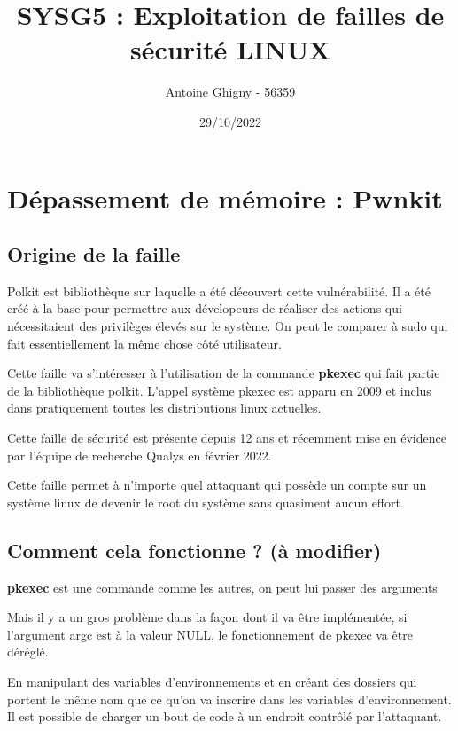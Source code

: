 \documentclass[a4paper, 12pt]{article}
\title{SYSG5 : Exploitation de failles de sécurité LINUX}
\author{Antoine Ghigny - 56359}          \let\Author\@author
\date{29/10/2022}           \let\Date\@date
\begin{document}
\maketitle 

   \tableofcontents

   \section{Dépassement de mémoire : Pwnkit}   		
		\subsection{Origine de la faille}   
   		\begin{flushleft}
			\noindent 	Polkit est bibliothèque sur laquelle a été découvert cette vulnérabilité. Il a été créé à la base pour permettre aux dévelopeurs de réaliser des actions qui nécessitaient des privilèges élevés sur le système. On peut le comparer à sudo qui fait essentiellement la même chose côté utilisateur.
   			\item Cette faille va s'intéresser à l'utilisation de la commande \textbf{pkexec} qui fait partie de la bibliothèque polkit. L'appel système pkexec est apparu en 2009 et inclus dans pratiquement toutes les distributions linux actuelles.
   			\item Cette faille de sécurité est présente depuis 12 ans et récemment mise en évidence par l'équipe de recherche Qualys en février 2022. \cite{qualys}
   			\item Cette faille permet à n’importe quel attaquant qui possède un compte sur un système linux de devenir le root du système sans quasiment aucun effort.
   		\end{flushleft}
   		\subsection{Comment cela fonctionne ? (à modifier) }
   		\begin{flushleft}
   			\noindent \textbf{pkexec} est une commande comme les autres, on peut lui passer des arguments
   			\item Mais il y a un gros problème dans la façon dont il va être implémentée, si l'argument argc est à la valeur NULL, le fonctionnement de pkexec va être déréglé. 
   			\item En manipulant des variables d'environnements et en créant des dossiers qui portent le même nom que ce qu'on va inscrire dans les variables d'environnement. Il est possible de charger un bout de code à un endroit contrôlé par l'attaquant. 
   		\end{flushleft}
   		
\end{document}
